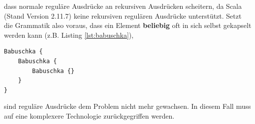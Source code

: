 dass normale reguläre Ausdrücke an rekursiven Ausdrücken scheitern, da Scala (Stand Version 2.11.7) keine rekursiven regulären Ausdrücke unterstützt. Setzt die Grammatik also voraus, dass ein Element \textbf{beliebig} oft in sich selbst gekapselt werden kann (z.B. Listing \ref{lst:babuschka}),
\begin{lstlisting}[style=scala, caption = {Beispiel für eine rekursive Grammatik anhand der russischen \textit{Babuschka} Puppen}, label = {lst:babuschka}]
Babuschka {
    Babuschka {
        Babuschka {}
    }
}
\end{lstlisting}sind reguläre Ausdrücke dem Problem nicht mehr gewachsen.
In diesem Fall muss auf eine komplexere Technologie zurückgegriffen werden.
\\\\\\\\\\\\\\\\\\
